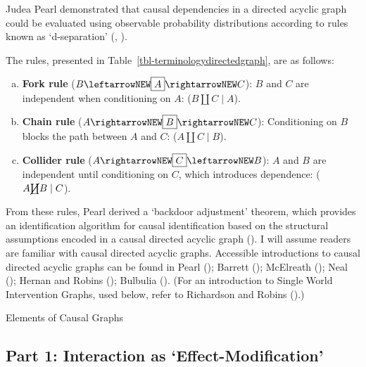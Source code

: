 \documentclass[
  single column]{article}
\begin{document}
Judea Pearl demonstrated that causal dependencies in a directed acyclic
graph could be evaluated using observable probability distributions
according to rules known as `d-separation'
(, ).

The rules, presented in Table~\ref{tbl-terminologydirectedgraph}, are as
follows:

\begin{enumerate}[a)]
     \item  {\bf Fork rule} ($B \leftarrowNEW \boxed{A} \rightarrowNEW C$): $B$ and $C$ are independent when conditioning on $A$: ($B \coprod C \mid A$).
     \item  {\bf Chain rule} ($A \rightarrowNEW \boxed{B} \rightarrowNEW C$): Conditioning on $B$ blocks the path between $A$ and $C$: ($A \coprod C \mid B$).
     \item  {\bf Collider rule} ($A \rightarrowNEW \boxed{C} \leftarrowNEW B$): $A$ and $B$ are independent until conditioning on $C$, which introduces dependence: ($A \cancel{\coprod} B \mid C$). 
 \end{enumerate}

From these rules, Pearl derived a `backdoor adjustment' theorem, which
provides an identification algorithm for causal identification based on
the structural assumptions encoded in a causal directed acyclic graph
(). I will assume readers are
familiar with causal directed acyclic graphs. Accessible introductions
to causal directed acyclic graphs can be found in Pearl
(); Barrett
(); McElreath
(); Neal
(); Hernan and Robins
(); Bulbulia
(). (For an introduction to Single
World Intervention Graphs, used below, refer to Richardson and Robins
().)

\begin{table}

\caption{\label{tbl-terminologydirectedgraph}Elements of Causal Graphs}

\centering{

\terminologydirectedgraph

}

\end{table}%

\newpage{}

\subsection{Part 1: Interaction as
`Effect-Modification'}\label{id-sec-1}
\end{document}
